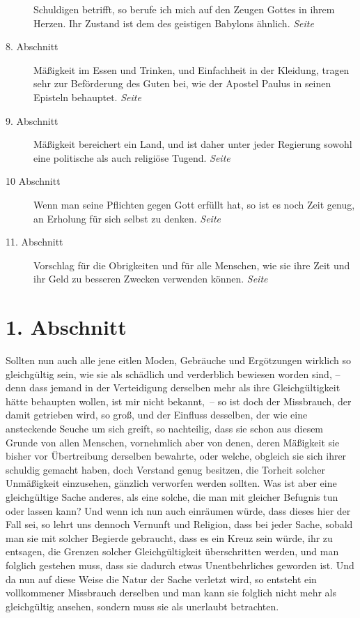 \begin{description}
Schuldigen betrifft, so berufe ich mich auf den Zeugen Gottes in ihrem Herzen.
Ihr Zustand ist dem des geistigen Babylons ähnlich.
\dotfill \textit{Seite~\pageref{kap18_ab7}}\\
\item[8. Abschnitt] Mäßigkeit im Essen und Trinken, und Einfachheit in der
Kleidung, tragen sehr zur Beförderung des Guten bei, wie der Apostel Paulus in
seinen Episteln behauptet.
\dotfill \textit{Seite~\pageref{kap18_ab8}}\\
\item[9. Abschnitt] Mäßigkeit bereichert ein Land, und ist daher unter jeder
Regierung sowohl eine politische als auch religiöse Tugend.
\dotfill \textit{Seite~\pageref{kap18_ab9}}\\
\item[10 Abschnitt] Wenn man seine Pflichten gegen Gott erfüllt hat, so ist es
noch Zeit genug, an Erholung für sich selbst zu denken.
\dotfill \textit{Seite~\pageref{kap18_ab10}}\\
\item[11. Abschnitt] Vorschlag für die Obrigkeiten und für alle Menschen, wie
sie ihre Zeit und ihr Geld zu besseren Zwecken verwenden können.
\dotfill \textit{Seite~\pageref{kap18_ab11}}\\

\end{description}

\newpage

\section{1. Abschnitt} \label{kap18_ab1}

Sollten nun auch alle jene eitlen Moden, Gebräuche und Ergötzungen wirklich so
gleichgültig sein, wie sie als schädlich und verderblich bewiesen worden sind,
-- denn dass jemand in der Verteidigung derselben mehr als ihre Gleichgültigkeit
hätte behaupten wollen, ist mir nicht bekannt,~-- so ist doch der Missbrauch,
der
damit getrieben wird, so groß, und der Einfluss desselben, der wie eine
ansteckende Seuche um sich greift, so nachteilig, dass sie schon aus diesem
Grunde von allen Menschen, vornehmlich aber von denen, deren Mäßigkeit sie
bisher vor Übertreibung derselben bewahrte, oder welche, obgleich sie sich
ihrer schuldig gemacht haben, doch Verstand genug besitzen, die Torheit solcher
Unmäßigkeit einzusehen, gänzlich verworfen werden sollten. Was ist aber eine
gleichgültige Sache anderes, als eine solche, die man mit gleicher Befugnis tun
oder lassen kann? Und wenn ich nun auch einräumen würde, dass dieses hier der
Fall sei, so lehrt uns dennoch Vernunft und Religion, dass bei jeder Sache,
sobald man sie mit solcher Begierde gebraucht, dass es ein Kreuz
sein würde, ihr
zu entsagen, die Grenzen solcher Gleichgültigkeit überschritten werden, und man
folglich gestehen muss, dass sie dadurch etwas Unentbehrliches geworden ist. Und
da nun auf diese Weise die Natur der Sache verletzt wird, so entsteht ein
vollkommener Missbrauch derselben und man kann sie folglich nicht mehr als
gleichgültig ansehen, sondern muss sie als unerlaubt betrachten.

